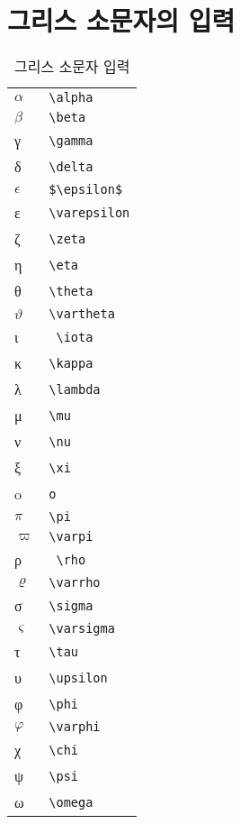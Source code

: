 \section{그리스 소문자의 입력}
	\begin{table}[hbp]
		\caption{그리스 소문자 입력}
		\centering
		\begin{tabular}{ l l }
		\toprule
		$\alpha$		&\verb|\alpha| \\
		$\beta$			&\verb|\beta|  \\ 
		γ 				&\verb|\gamma|  \\
		δ 				&\verb|\delta|  \\ 
		$\epsilon$		&\verb|$\epsilon$|  \\
		ε				&\verb|\varepsilon| \\
		ζ 				&\verb|\zeta| \\ 
		η 				&\verb|\eta|  \\
		θ 				&\verb|\theta| \\
		$\vartheta$ 	&\verb|\vartheta| \\
		ι				&\verb| \iota|  \\		 
		κ 				&\verb|\kappa| \\		
		λ				&\verb|\lambda| \\		
		μ				&\verb|\mu|	 \\		
		ν				&\verb|\nu|	 \\		
		ξ 				&\verb|\xi| \\			
		o				&\verb|o| \\		
		$\pi$			&\verb|\pi| \\		
		$\varpi$	 	&\verb|\varpi| \\	
		ρ				&\verb| \rho| \\	
		$\varrho$		&\verb|\varrho| \\	
		σ		&\verb|\sigma| \\	
		$\varsigma$	&\verb|\varsigma| \\
		τ		&\verb|\tau|  \\
		υ 	&\verb|\upsilon| \\
		φ		&\verb|\phi| \\
		$\varphi$	 	&\verb|\varphi| \\
		χ		&\verb|\chi| \\
		ψ		&\verb|\psi| \\
		ω		&\verb|\omega| \\
	    \bottomrule
		\end{tabular}%
	\end{table}%


